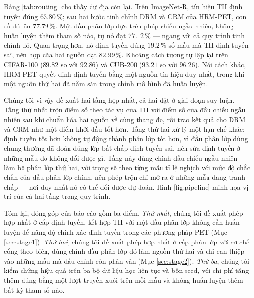 \documentclass[11pt,a4paper]{article}
\begin{document}
Bảng \ref{tab:routing} cho thấy dư địa còn lại. Trên ImageNet-R, tín hiệu TII
định tuyến đúng $63.80\,\%$; sau hai bước tinh chỉnh DRM và CRM của HRM-PET, con
số đó lên $77.79\,\%$. Một đầu phân lớp dựa trên phép chiếu ngẫu nhiên, không
huấn luyện thêm tham số nào, tự nó đạt $77.12\,\%$ --- ngang với cả quy trình
tinh chỉnh đó. Quan trọng hơn, nó định tuyến đúng $19.2\,\%$ số mẫu mà TII định
tuyến sai, nên hợp của hai nguồn đạt $82.99\,\%$. Khoảng cách tương tự lặp lại
trên CIFAR-100 ($89.82$ so với $92.86$) và CUB-200 ($93.21$ so với $96.26$). Nói
cách khác, HRM-PET quyết định định tuyến bằng một nguồn tín hiệu duy nhất, trong
khi một nguồn thứ hai đã nằm sẵn trong chính mô hình đã huấn luyện.

Chúng tôi vì vậy đề xuất hai tầng hợp nhất, cả hai đặt ở giai đoạn suy luận.
Tầng thứ nhất trộn điểm số theo tác vụ của TII với điểm số của đầu chiếu ngẫu
nhiên sau khi chuẩn hóa hai nguồn về cùng thang đo, rồi trao kết quả cho DRM và
CRM như một điểm khởi đầu tốt hơn. Tầng thứ hai xử lý một hạn chế khác: định
tuyến tốt hơn không tự động thành phân lớp tốt hơn, vì đầu phân lớp dùng chung
thường đã đoán đúng lớp bất chấp định tuyến sai, nên sửa định tuyến ở những mẫu
đó không đổi được gì. Tầng này dùng chính đầu chiếu ngẫu nhiên làm bộ phân lớp
thứ hai, với trọng số theo từng mẫu tỉ lệ nghịch với mức độ chắc chắn của đầu
phân lớp chính, nên phép trộn chỉ mở ra ở những mẫu đang tranh chấp --- nơi duy
nhất nó có thể đổi được dự đoán. Hình \ref{fig:pipeline} minh họa vị trí của cả
hai tầng trong quy trình.

Tóm lại, đóng góp của báo cáo gồm ba điểm. \emph{Thứ nhất}, chúng tôi đề xuất
phép hợp nhất ở cấp định tuyến, kết hợp TII với một đầu phân lớp không cần huấn
luyện để nâng độ chính xác định tuyến trong các phương pháp PET
(Mục \ref{sec:stage1}). \emph{Thứ hai}, chúng tôi đề xuất phép hợp nhất ở cấp
phân lớp với cơ chế cổng theo biên, dùng chính đầu phân lớp đó làm nguồn thứ hai
và chỉ can thiệp vào những mẫu mà đầu chính còn phân vân (Mục \ref{sec:stage2}).
\emph{Thứ ba}, chúng tôi kiểm chứng hiệu quả trên ba bộ dữ liệu học liên tục và
bốn seed, với chi phí tăng thêm đúng bằng một lượt truyền xuôi trên mỗi mẫu và
không huấn luyện thêm bất kỳ tham số nào.
\end{document}
